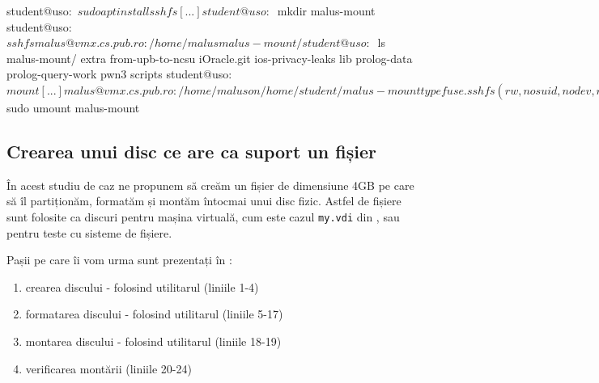 \begin{screen}[caption={Folosirea sshfs},label={lst:storage:sshfs}]
student@uso:~$ sudo apt install sshfs
[...]
student@uso:~$ mkdir malus-mount
student@uso:~$ sshfs malus@vmx.cs.pub.ro:/home/malus malus-mount/
student@uso:~$ ls malus-mount/
extra  from-upb-to-ncsu  iOracle.git  ios-privacy-leaks  lib  prolog-data  prolog-query-work  pwn3  scripts
student@uso:~$ mount
[...]
malus@vmx.cs.pub.ro:/home/malus on /home/student/malus-mount type fuse.sshfs (rw,nosuid,nodev,relatime,user_id=1000,group_id=1000)
student@uso:~$ sudo umount malus-mount
\end{screen}

\subsection{Crearea unui disc ce are ca suport un fișier}
\label{sec:storage:mount:disk-in-file}

În acest studiu de caz ne propunem să creăm un fișier de dimensiune 4GB pe care să îl partiționăm, formatăm și montăm întocmai unui disc fizic.
 Astfel de fișiere sunt folosite ca discuri pentru mașina virtuală, cum este cazul \texttt{my.vdi} din , sau pentru teste cu sisteme de fișiere.

Pașii pe care îi vom urma sunt prezentați în :

\begin{enumerate}
  \item crearea discului - folosind utilitarul  (liniile 1-4)
  \item formatarea discului - folosind utilitarul  (liniile 5-17)
  \item montarea discului - folosind utilitarul  (liniile 18-19)
  \item verificarea montării (liniile 20-24)
\end{enumerate}


